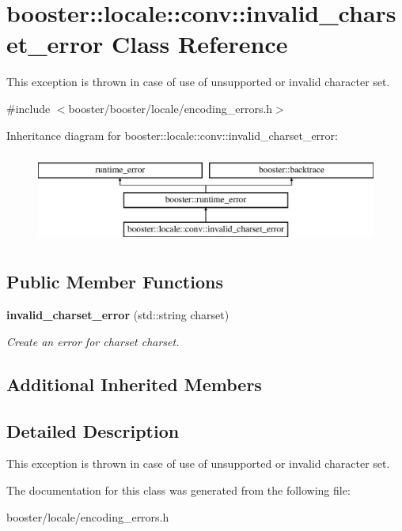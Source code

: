 \section{booster\-:\-:locale\-:\-:conv\-:\-:invalid\-\_\-charset\-\_\-error Class Reference}
\label{classbooster_1_1locale_1_1conv_1_1invalid__charset__error}


This exception is thrown in case of use of unsupported or invalid character set.  




{\ttfamily \#include $<$booster/booster/locale/encoding\-\_\-errors.\-h$>$}

Inheritance diagram for booster\-:\-:locale\-:\-:conv\-:\-:invalid\-\_\-charset\-\_\-error\-:\begin{figure}[H]
\begin{center}
\leavevmode
\includegraphics[height=3.000000cm]{classbooster_1_1locale_1_1conv_1_1invalid__charset__error}
\end{center}
\end{figure}
\subsection*{Public Member Functions}
\begin{DoxyCompactItemize}
\item 
{\bf invalid\-\_\-charset\-\_\-error} (std\-::string charset)\label{classbooster_1_1locale_1_1conv_1_1invalid__charset__error_a80039183bc0c89b03e70e832ad7f1477}

\begin{DoxyCompactList}\small\item\em Create an error for charset {\itshape charset}. \end{DoxyCompactList}\end{DoxyCompactItemize}
\subsection*{Additional Inherited Members}


\subsection{Detailed Description}
This exception is thrown in case of use of unsupported or invalid character set. 

The documentation for this class was generated from the following file\-:\begin{DoxyCompactItemize}
\item 
booster/locale/encoding\-\_\-errors.\-h\end{DoxyCompactItemize}
